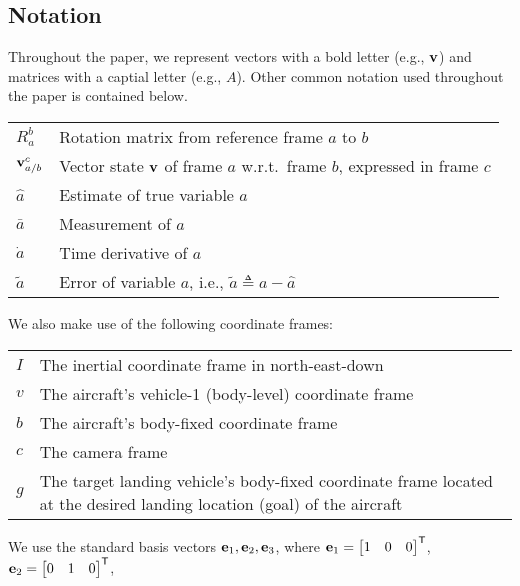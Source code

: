 
\subsection{Notation}

Throughout the paper, we represent vectors with a bold letter (e.g., $\bf v$)
and matrices with a captial letter (e.g., $A$). Other common notation used
throughout the paper is contained below.
\begin{center}
\begin{tabularx}{\columnwidth}{lX}
$R_a^b$ & Rotation matrix from reference frame $a$ to $b$ \\
$\mathrm{\mathbf{v}}_{a/b}^c$ & Vector state $\mathrm{\mathbf{v}}$ of frame $a$ w.r.t.~frame $b$, expressed in frame $c$ \\
$\hat{a}$ & Estimate of true variable $a$ \\
$\bar{a}$ & Measurement of $a$ \\
$\dot{a}$ & Time derivative of $a$ \\
$\tilde{a}$ & Error of variable $a$, i.e., $\tilde{a} \triangleq a - \hat{a}$
\end{tabularx}
\end{center}
%
We also make use of the following coordinate frames:
\begin{center}
\begin{tabularx}{\columnwidth}{lX}
$I$ & The inertial coordinate frame in north-east-down\\
$v$ & The aircraft's vehicle-1 (body-level) coordinate frame \\
$b$ & The aircraft's body-fixed coordinate frame \\
$c$ & The camera frame \\
$g$ & The target landing vehicle's body-fixed coordinate frame located at the desired
landing location (goal) of the aircraft
\end{tabularx}
\end{center}
%
We use the standard basis vectors $\mathrm{\mathbf{e}}_1, \mathrm{\mathbf{e}}_2, \mathrm{\mathbf{e}}_3$,
where $\mathrm{\mathbf{e}}_1 = \begin{bmatrix} 1 & 0 & 0 \end{bmatrix}^{\mathsf{T}}$,
$\mathrm{\mathbf{e}}_2 = \begin{bmatrix} 0 & 1 & 0 \end{bmatrix}^{\mathsf{T}}$,
